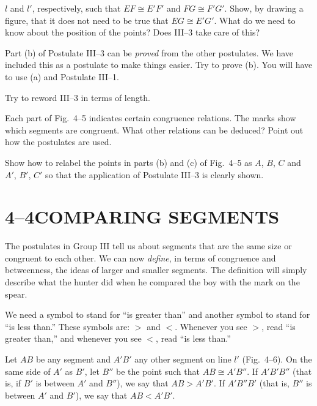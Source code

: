 \documentclass[11pt]{book}
\theoremstyle{bkplain}
\theoremstyle{XIplainnote}
\theoremstyle{bkplain}
\theoremstyle{bkplain}
\begin{document}
\begin{exercisecols}
\begin{exlist}
      $l$ and $l'$, respectively, such that $EF \cong E'F'$ and
      $FG \cong F'G'$. Show, by drawing a figure, that it does not need to be
      true that $EG \cong E'G'$. What do we need to know about the position of
      the points? Does III--3 take care of this?
\item[\stex 13.] Part (b) of Postulate III--3 can be \emph{proved} from the
      other postulates. We have included this as a postulate to make things
      easier. Try to prove (b). You will have to use (a) and Postulate III--1.
\item[\stex 14.] Try to reword III--3 in terms of length.
\item[15.] Each part of Fig.~4--5 indicates certain congruence relations. The
      marks show which segments are congruent. What other relations can be
      deduced? Point out how the postulates are used.
\exfig{\FIGIVFIVE}
\item[\stex 16.] Show how to relabel the points in parts (b) and (c) of
      Fig.~4--5 as $A$, $B$, $C$ and $A'$, $B'$, $C'$ so that the application of
      Postulate III--3 is clearly shown.
\end{exlist}
\end{exercisecols}

\section*{4--4\quad COMPARING SEGMENTS}

The postulates in Group III tell us about segments that are the same size or
congruent to each other. We can now \emph{define}, in terms of congruence and
betweenness, the ideas of larger and smaller segments. The definition will simply
describe what the hunter did when he compared the boy with the mark on the spear.

We need a symbol to stand for ``is greater than'' and another symbol to stand for
``is less than.'' These symbols are: $>$ and $<$. Whenever you see $>$, read
``is greater than,'' and whenever you see $<$, read ``is less than.''

\begin{definition}
Let $AB$ be any segment and $A'B'$ any other segment on line $l'$ (Fig.~4--6). On
the same side of $A'$ as $B'$, let $B''$ be the point such that
$AB \cong A'B''$. If $A'B'B''$ (that is, if $B'$ is between $A'$ and $B''$), we
say that $AB > A'B'$. If $A'B''B'$ (that is, $B''$ is between $A'$ and $B'$), we
say that $AB < A'B'$.
\end{definition}
\end{document}
